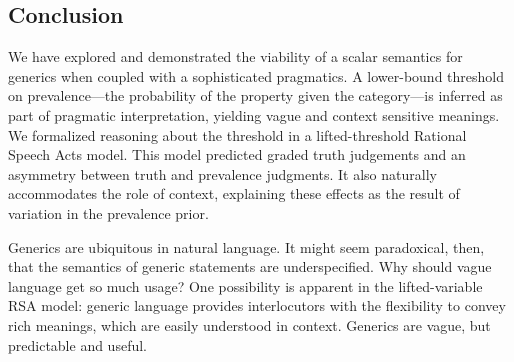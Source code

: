 \documentclass[10pt,letterpaper]{article}
\begin{document}
\subsection{Conclusion} 


We have explored and demonstrated the viability of a scalar semantics for generics when coupled with a sophisticated pragmatics. 
A lower-bound threshold on prevalence---the probability of the property given the category---is inferred as part of pragmatic interpretation, yielding vague and context sensitive meanings. 
%
%
We formalized reasoning about the threshold in a lifted-threshold Rational Speech Acts model. This model predicted graded truth judgements and an asymmetry between truth and prevalence judgments. It also naturally accommodates the role of context, explaining these effects as the result of variation in the prevalence prior. 

Generics are ubiquitous in natural language. It might seem paradoxical, then, that the semantics of generic statements are underspecified. Why should vague language get so much usage? One possibility is apparent in the lifted-variable RSA model: generic language provides interlocutors with the flexibility to convey rich meanings, which are easily understood in context. 
Generics are vague, but predictable and useful.



%
\end{document}
